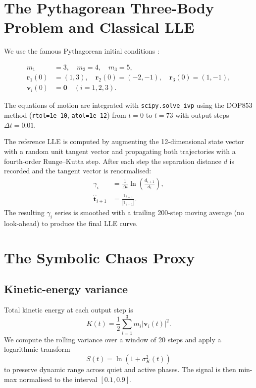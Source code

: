 \documentclass[useAMS,usenatbib,onecolumn]{mnras}
\begin{document}
\section{The Pythagorean Three-Body Problem and Classical LLE}
\label{sec:background}

We use the famous Pythagorean initial conditions \citep{szebehely1967, mikkola2007}:

\begin{align*}
m_1 &= 3, \quad m_2 = 4, \quad m_3 = 5, \\
\mathbf{r}_1(0) &= (1,3), \quad
\mathbf{r}_2(0) = (-2,-1), \quad
\mathbf{r}_3(0) = (1,-1), \\
\mathbf{v}_i(0) &= \mathbf{0} \quad (i=1,2,3).
\end{align*}

The equations of motion are integrated with \texttt{scipy.solve\_ivp} using the DOP853 method (\texttt{rtol=1e-10}, \texttt{atol=1e-12}) from $t=0$ to $t=73$ with output steps $\Delta t=0.01$.

The reference LLE is computed by augmenting the 12-dimensional state vector 
with a random unit tangent vector and propagating both trajectories with a 
fourth-order Runge--Kutta step. After each step the separation distance $d$ 
is recorded and the tangent vector is renormalised:
\begin{align}
\gamma_i &= \frac{1}{\Delta t}\ln\left(\frac{d_{i+1}}{d_i}\right), \\
\hat{\mathbf{t}}_{i+1} &= \frac{\mathbf{t}_{i+1}}{|\mathbf{t}_{i+1}|}.
\end{align}
The resulting $\gamma_i$ series is smoothed with a trailing 200-step moving average (no look-ahead) to produce the final LLE curve.

\section{The Symbolic Chaos Proxy}
\label{sec:proxy}

\subsection{Kinetic-energy variance}
Total kinetic energy at each output step is
\[
K(t) = \frac12 \sum_{i=1}^3 m_i |\mathbf{v}_i(t)|^2.
\]
We compute the rolling variance over a window of 20 steps and apply a logarithmic transform
\[
S(t) = \ln(1 + \sigma_K^2(t))
\]
to preserve dynamic range across quiet and active phases. The signal is then min-max normalised to the interval $[0.1,0.9]$.
\end{document}
